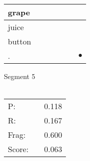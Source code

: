 \documentclass[landscape]{article}
\newcommand{\ssp}{\hspace{2pt}}
\newcommand{\mex}{\cellcolor{g}$\bullet$}
\begin{document}
\begin{tabular}{|l|p{10pt}|p{10pt}|p{10pt}|p{10pt}|p{10pt}|p{10pt}|}
\hline
\ssp grape \ssp&\hspace{2pt}&\hspace{2pt}&\hspace{2pt}&\hspace{2pt}&\hspace{2pt}&\hspace{2pt}\\
\hline
\ssp juice \ssp&\hspace{2pt}&\hspace{2pt}&\hspace{2pt}&\hspace{2pt}&\hspace{2pt}&\hspace{2pt}\\
\hline
\ssp button \ssp&\hspace{2pt}&\hspace{2pt}&\hspace{2pt}&\hspace{2pt}&\hspace{2pt}&\hspace{2pt}\\
\hline
\ssp \cellcolor{ref5}. \ssp&\hspace{2pt}&\hspace{2pt}&\hspace{2pt}&\hspace{2pt}&\hspace{2pt}&\hspace{2pt}\mex\\
\hline
\end{tabular}

\vspace{6pt}
\noindent Segment 5\\\\
\noindent\begin{tabular}{lm{12pt}r}
\hline
P:&&0.118\\
R:&&0.167\\
Frag:&&0.600\\
Score:&&0.063\\
\end{tabular}

\newpage
\end{document}
